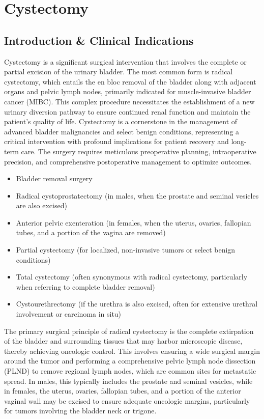 \chapter{Cystectomy}

\section*{Introduction \& Clinical Indications}
Cystectomy is a significant surgical intervention that involves the complete or partial excision of the urinary bladder. The most common form is radical cystectomy, which entails the en bloc removal of the bladder along with adjacent organs and pelvic lymph nodes, primarily indicated for muscle-invasive bladder cancer (MIBC). This complex procedure necessitates the establishment of a new urinary diversion pathway to ensure continued renal function and maintain the patient's quality of life. Cystectomy is a cornerstone in the management of advanced bladder malignancies and select benign conditions, representing a critical intervention with profound implications for patient recovery and long-term care. The surgery requires meticulous preoperative planning, intraoperative precision, and comprehensive postoperative management to optimize outcomes.

\begin{itemize}
  \item Bladder removal surgery
  \item Radical cystoprostatectomy (in males, when the prostate and seminal vesicles are also excised)
  \item Anterior pelvic exenteration (in females, when the uterus, ovaries, fallopian tubes, and a portion of the vagina are removed)
  \item Partial cystectomy (for localized, non-invasive tumors or select benign conditions)
  \item Total cystectomy (often synonymous with radical cystectomy, particularly when referring to complete bladder removal)
  \item Cystourethrectomy (if the urethra is also excised, often for extensive urethral involvement or carcinoma in situ)
\end{itemize}

The primary surgical principle of radical cystectomy is the complete extirpation of the bladder and surrounding tissues that may harbor microscopic disease, thereby achieving oncologic control. This involves ensuring a wide surgical margin around the tumor and performing a comprehensive pelvic lymph node dissection (PLND) to remove regional lymph nodes, which are common sites for metastatic spread. In males, this typically includes the prostate and seminal vesicles, while in females, the uterus, ovaries, fallopian tubes, and a portion of the anterior vaginal wall may be excised to ensure adequate oncologic margins, particularly for tumors involving the bladder neck or trigone.

